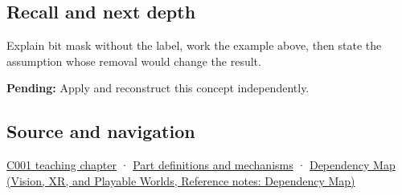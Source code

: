 \subsection{Recall and next depth}\label{appendix-dbe5905163c2-recall-and-next-depth}

Explain bit mask without the label, work the example above, then state the assumption whose removal would change the result.

\textbf{Pending:} Apply and reconstruct this concept independently.

\subsection{Source and navigation}\label{appendix-dbe5905163c2-source-and-navigation}

\hyperref[01-foundations-i-ch001-from-a-signal-to-an-interpretation]{C001 teaching chapter} · \hyperref[appendix-fd090d982a15]{Part definitions and mechanisms} · \href{../07-Vision-XR-and-Playable-Worlds/main.pdf\#nameddest=appendix-4ad47bdd269a}{Dependency Map (Vision, XR, and Playable Worlds, Reference notes: Dependency Map)}
